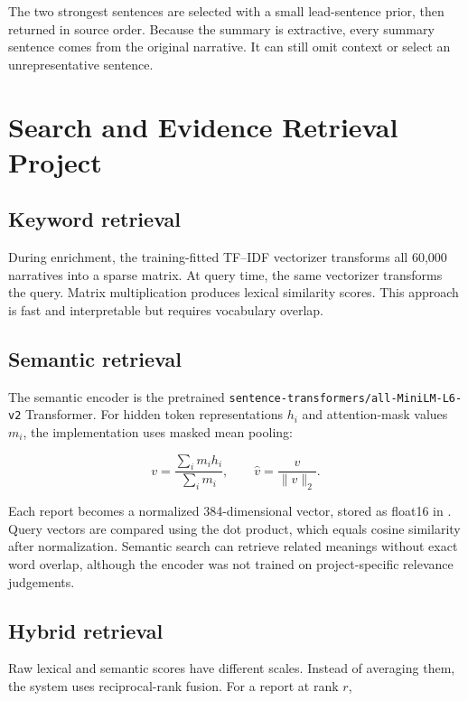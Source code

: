 \documentclass[12pt,a4paper]{report}
\newcommand{\code}[1]{\texttt{#1}}
\begin{document}
The two strongest sentences are selected with a small lead-sentence prior, then returned in source order. Because the summary is extractive, every summary sentence comes from the original narrative. It can still omit context or select an unrepresentative sentence.

\chapter{Search and Evidence Retrieval Project}

\section{Keyword retrieval}

During enrichment, the training-fitted TF--IDF vectorizer transforms all 60,000 narratives into a sparse matrix. At query time, the same vectorizer transforms the query. Matrix multiplication produces lexical similarity scores. This approach is fast and interpretable but requires vocabulary overlap.

\section{Semantic retrieval}

The semantic encoder is the pretrained \code{sentence-transformers/all-MiniLM-L6-v2} Transformer. For hidden token representations $h_i$ and attention-mask values $m_i$, the implementation uses masked mean pooling:

\begin{equation}
v=\frac{\sum_i m_ih_i}{\sum_i m_i},\qquad \hat{v}=\frac{v}{\|v\|_2}.
\end{equation}

Each report becomes a normalized 384-dimensional vector, stored as float16 in . Query vectors are compared using the dot product, which equals cosine similarity after normalization. Semantic search can retrieve related meanings without exact word overlap, although the encoder was not trained on project-specific relevance judgements.

\section{Hybrid retrieval}

Raw lexical and semantic scores have different scales. Instead of averaging them, the system uses reciprocal-rank fusion. For a report at rank $r$,
\end{document}
